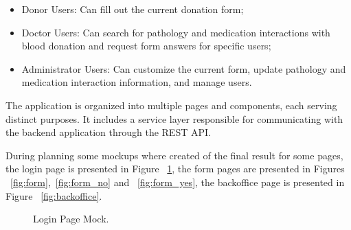 \begin{itemize}
	\item Donor Users: Can fill out the current donation form;
	\item Doctor Users: Can search for pathology and medication interactions with blood donation and request form answers for specific users;
	\item Administrator Users: Can customize the current form, update pathology and medication interaction information, and manage users.
\end{itemize}

The application is organized into multiple pages and components, each serving distinct purposes. It includes a service layer responsible for communicating with the backend application through the REST API.

During planning some mockups where created of the final result for some pages, the login page is presented in Figure ~\ref{fig:login}, the form pages are presented in Figures ~\ref{fig:form},~\ref{fig:form_no} and ~\ref{fig:form_yes}, the backoffice page is presented in Figure ~\ref{fig:backoffice}.

\begin{figure}[H]
	\begin{center}
	\end{center}
	\caption{Login Page Mock.}\label{fig:login}
\end{figure}

